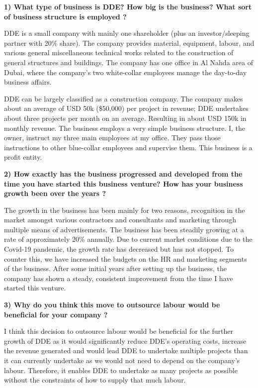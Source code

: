 

\textbf{1) What type of business is DDE? How big is the business? What sort of business structure is employed ?}

{DDE is a small company with mainly one shareholder (plus an investor/sleeping partner with 20\% share). The company provides material, equipment, labour, and various general miscellaneous technical works related to the construction of general structures and buildings. The company has one office in Al Nahda area of Dubai, where the company's two white-collar employees manage the day-to-day business affairs.}

{DDE can be largely classified as a construction company. The company makes about an average of USD 50k (\$50,000) per project in revenue; DDE undertakes about three projects per month on an average. Resulting in about USD 150k in monthly revenue. The business employs a very simple business structure. I, the owner, instruct my three main employees at my office. They pass those instructions to other blue-collar employees and supervise them. This business is a profit entity.}

\textbf{2) How exactly has the business progressed and developed from the time you have started this business venture? How has your business growth been over the years ?}

{The growth in the business has been mainly for two reasons, recognition in the market amongst various contractors and consultants and marketing through multiple means of advertisements. The business has been steadily growing at a rate of approximately 20\% annually. Due to current market conditions due to the Covid-19 pandemic, the growth rate has decreased but has not stopped. To counter this, we have increased the budgets on the HR and marketing segments of the business. After some initial years after setting up the business, the company has shown a steady, consistent improvement from the time I have started this venture.}

\textbf{3) Why do you think this move to outsource labour would be beneficial for your company ?}

{I think this decision to outsource labour would be beneficial for the further growth of DDE as it would significantly reduce DDE's operating costs, increase the revenue generated and would lead DDE to undertake multiple projects than it can currently undertake as we would not need to depend on the company's labour. Therefore, it enables DDE to undertake as many projects as possible without the constraints of how to supply that much labour.}


